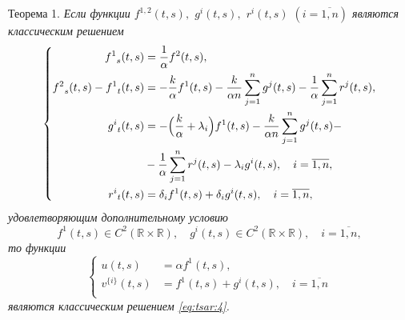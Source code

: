 \smallskip

\hypertarget{tsar:th1}{}

{\small \sc Теорема 1.}
\it
Если функции ${f^{1,2}}(t,s),$ $g^{i}(t,s),$ $r^{i}(t,s)$ $\left( i = \overline{ 1,n } \right)$ 
являются классическим решением
\begin{equation}
\left\{
\begin{aligned}
{f^1}_s(t,s) &= \frac{1}{\alpha} {f^2}(t,s),\\
{f^2}_s(t,s) - {f^1}_t(t,s)&= - \frac{k}{\alpha} {f^1}(t,s)
							  - \frac{k}{\alpha n} \sum_{j=1}^{n} {g^{j}}(t,s)
							  - \frac{1}{\alpha} \sum_{j=1}^{n} {r^{j}}(t,s), \\
{g^{i}}_t(t,s) &= -\Bigl( \frac{k}{\alpha} + \lambda_i \Bigr) {f^1}(t,s)
				- \frac{k}{\alpha n} \sum_{j=1}^{n} {g^{j}}(t,s) -
				\\&				
				- \frac{1}{\alpha} \sum_{j=1}^{n} {r^{j}}(t,s) -
				\lambda_i {g^{i}}(t,s)
				, \quad i = \overline{ 1,n }
				,\\
{r^{i}}_t(t,s) &= \delta_i {f^1}(t,s)
				+ \delta_i {g^{i}}(t,s)
				, \quad i = \overline{ 1,n }
				,\\
\end{aligned}
\right. \label{eq:tsar:6_5}
\end{equation}
удовлетворяющим дополнительному условию
\begin{equation}
{f^1}(t,s) \in C^2({\mathbb R \times \mathbb R }), \quad 
g^{i}(t,s) \in C^2({\mathbb R \times \mathbb R }), \quad i = \overline{ 1,n },
\label{eq:tsar:6_5_usl}
\end{equation}
то функции
\begin{equation}
\left\{
\begin{aligned}
u(t,s) &= \alpha {f^{1}}(t,s), \\
v^{\{i\}}(t,s) &= {f^{1}}(t,s) + {g^{i}}(t,s), \quad i = \overline{ 1,n }\\
\end{aligned}
\right. \label{eq:tsar:5_5}
\end{equation}
являются классическим решением \rm \eqref{eq:tsar:4}. \it

